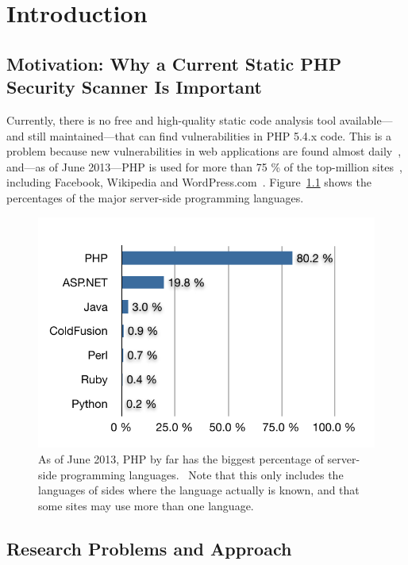 \chapter{Introduction}

\section{Motivation: Why a Current Static PHP Security Scanner Is Important}
Currently, there is no free and high-quality static code analysis tool available---and still maintained---that can find vulnerabilities in PHP 5.4.x code. This is a problem because new vulnerabilities in web applications are found almost daily~\cite{osvdb}, and---as of June 2013---PHP is used for more than 75 \% of the top-million sites~\cite{w3techs-php-usage}, including Facebook, Wikipedia and WordPress.com~\cite{w3techs-php-sites}. Figure~\ref{fig:php-percentage} shows the percentages of the major server-side programming languages.

\begin{figure}[htb]
  \begin{center}
    \includegraphics[scale=1.0]{images/language-percentage}
    \caption{As of June 2013, PHP by far has the biggest percentage of server-side programming languages.~\cite{w3techs-php-usage} Note that this only includes the languages of sides where the language actually is known, and that some sites may use more than one language.}
    \label{fig:php-percentage}
  \end{center}
\end{figure}


\section{Research Problems and Approach}

